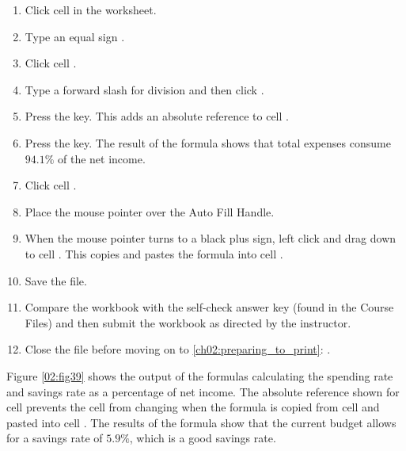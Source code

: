 \begin{enumerate}
	\item Click cell  in the  worksheet.
	\item Type an equal sign \fmtTyping{=}.
	\item Click cell .
	\item Type a forward slash \fmtTyping{/} for division and then click .
	\item Press the  key. This adds an absolute reference to cell .
	\item Press the  key. The result of the formula shows that total expenses consume $ 94.1\% $ of the net income.
	\item Click cell .
	\item Place the mouse pointer over the Auto Fill Handle.
	\item When the mouse pointer turns to a black plus sign, left click and drag down to cell . This copies and pastes the formula into cell .
	\item Save the  file.
	\item Compare the workbook with the self-check answer key (found in the Course Files) and then submit the  workbook as directed by the instructor.
	\item Close the  file before moving on to \ref{ch02:preparing_to_print}: .
\end{enumerate}

Figure \ref{02:fig39} shows the output of the formulas calculating the spending rate and savings rate as a percentage of net income. The absolute reference shown for cell  prevents the cell from changing when the formula is copied from cell  and pasted into cell . The results of the formula show that the current budget allows for a savings rate of $ 5.9\% $, which is a good savings rate.

